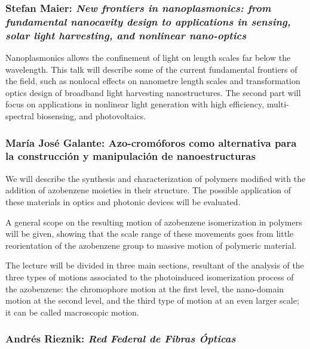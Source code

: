 \subsubsection*{Stefan Maier: \textit{New frontiers in nanoplasmonics: from
fundamental nanocavity design to applications in sensing, solar light
harvesting, and nonlinear nano-optics}}

Nanoplasmonics allows the confinement of light on length scales far below the
wavelength. This talk will describe some of the current fundamental frontiers of
the field, such as nonlocal effects on nanometre length scales and
transformation optics design of broadband light harvesting nanostructures. The
second part will focus on applications in nonlinear light generation with high
efficiency, multi-spectral biosensing, and photovoltaics.

\subsubsection*{Mar\'ia Jos\'e Galante: Azo-crom\'oforos como alternativa para
la construcci\'on y manipulaci\'on de nanoestructuras}

We will describe the synthesis and characterization of polymers modified with
the addition of azobenzene moieties in their structure. The possible application
of these materials in optics and photonic devices will be evaluated.

A general scope on the resulting motion of azobenzene isomerization in polymers
will be given, showing that the scale range of these movements goes from little
reorientation of the azobenzene group to massive motion of polymeric material.

The lecture will be divided in three main sections, resultant of the analysis of
the three types of motions associated to the photoinduced isomerization process
of the azobenzene: the chromophore motion at the first level, the nano-domain
motion at the second level, and the third type of motion at an even larger
scale; it can be called macroscopic motion.

\subsubsection*{Andr\'es Rieznik: \textit{Red Federal de Fibras \'Opticas}}

